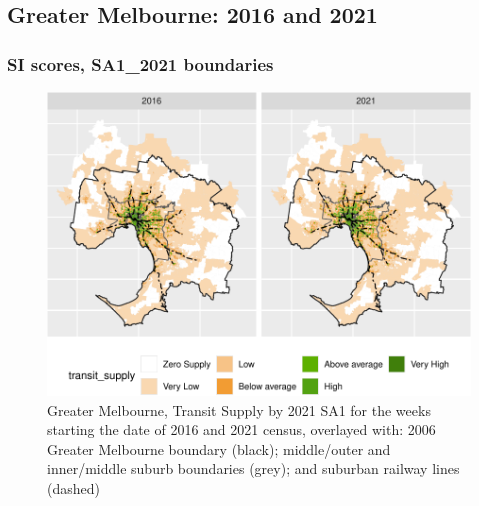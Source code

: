 \documentclass[preprint, 3p,
authoryear]{elsarticle} %
\begin{document}
\subsection{Greater Melbourne: 2016 and
2021}\label{greater-melbourne-2016-and-2021}

\subsubsection{SI scores, SA1\_2021
boundaries}\label{si-scores-sa1_2021-boundaries}

\begin{figure}
\centering
\includegraphics{Leveraging_GTFS_to_assess_transit_supply_Transport_Geography_files/figure-latex/Greater_Melbourne_2016_2021_plot-1.pdf}
\caption{Greater Melbourne, Transit Supply by 2021 SA1 for the weeks
starting the date of 2016 and 2021 census, overlayed with: 2006 Greater
Melbourne boundary (black); middle/outer and inner/middle suburb
boundaries (grey); and suburban railway lines (dashed)}
\end{figure}
\end{document}
